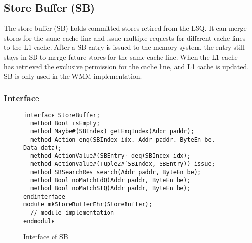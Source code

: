\subsection{Store Buffer (SB)}\label{sec:sb}

The store buffer (SB) holds committed stores retired from the LSQ.
It can  merge stores for the same cache line and issue multiple requests for different cache lines to the L1 cache.
After a SB entry is issued to the memory system, the entry still stays in SB to merge future stores for the same cache line.
When the L1 cache has retrieved the exclusive permission for the cache line, and L1 cache is updated.
SB is only used in the WMM implementation.

\subsubsection{Interface}

\begin{figure}
\begin{lstlisting}[caption={}]
interface StoreBuffer;
  method Bool isEmpty;
  method Maybe#(SBIndex) getEnqIndex(Addr paddr);
  method Action enq(SBIndex idx, Addr paddr, ByteEn be, Data data);
  method ActionValue#(SBEntry) deq(SBIndex idx);
  method ActionValue#(Tuple2#(SBIndex, SBEntry)) issue;
  method SBSearchRes search(Addr paddr, ByteEn be);
  method Bool noMatchLdQ(Addr paddr, ByteEn be); 
  method Bool noMatchStQ(Addr paddr, ByteEn be); 
endinterface
module mkStoreBufferEhr(StoreBuffer);
  // module implementation
endmodule
\end{lstlisting}
\caption{Interface of SB}\label{fig:sb-ifc}
\end{figure}

